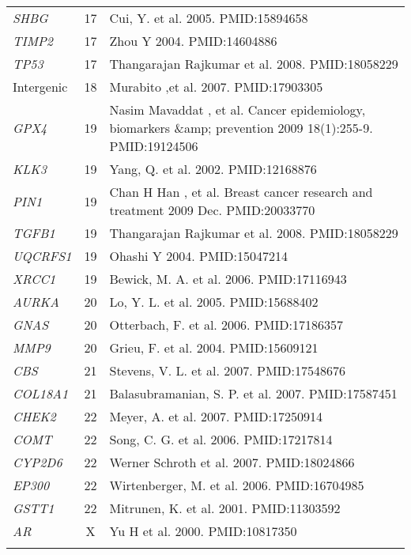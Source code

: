 \documentclass[10pt]{article}
\begin{document}
\begin{landscape}
\begin{center}
\begin{longtable}[H]{lcl}
\textit{SHBG} & 17 & Cui, Y.  et al. 2005. PMID:15894658\\[2pt]
\textit{TIMP2} & 17 & Zhou Y 2004. PMID:14604886\\[2pt]
\textit{TP53} & 17 & Thangarajan Rajkumar  et al.  2008. PMID:18058229\\[2pt]
Intergenic & 18 & Murabito ,et al. 2007. PMID:17903305\\[2pt]
\textit{GPX4} & 19 & Nasim Mavaddat  , et al.  Cancer epidemiology, biomarkers \&amp; prevention
  2009 18(1):255-9. PMID:19124506\\[2pt]
\textit{KLK3} & 19 & Yang, Q.  et al. 2002. PMID:12168876\\[2pt]
\textit{PIN1} & 19 & Chan H Han  , et al.  Breast cancer research and treatment  2009 Dec.
PMID:20033770\\[2pt]
\textit{TGFB1} & 19 & Thangarajan Rajkumar  et al.  2008. PMID:18058229\\[2pt]
\textit{UQCRFS1} & 19 & Ohashi Y 2004. PMID:15047214\\[2pt]
\textit{XRCC1} & 19 & Bewick, M. A.  et al. 2006. PMID:17116943\\[2pt]
\textit{AURKA} & 20 & Lo, Y. L.  et al. 2005. PMID:15688402\\[2pt]
\textit{GNAS} & 20 & Otterbach, F.  et al. 2006. PMID:17186357\\[2pt]
\textit{MMP9} & 20 & Grieu, F.  et al. 2004. PMID:15609121\\[2pt]
\textit{CBS} & 21 & Stevens, V. L.  et al. 2007. PMID:17548676\\[2pt]
\textit{COL18A1} & 21 & Balasubramanian, S. P.  et al. 2007. PMID:17587451\\[2pt]
\textit{CHEK2} & 22 & Meyer, A.  et al. 2007. PMID:17250914\\[2pt]
\textit{COMT} & 22 & Song, C. G.  et al. 2006. PMID:17217814\\[2pt]
\textit{CYP2D6} & 22 & Werner Schroth  et al.  2007. PMID:18024866\\[2pt]
\textit{EP300} & 22 & Wirtenberger, M.  et al. 2006. PMID:16704985\\[2pt]
\textit{GSTT1} & 22 & Mitrunen, K.  et al. 2001. PMID:11303592\\[2pt]
\textit{AR} & X & Yu H et al. 2000. PMID:10817350\\[1.5pt]\hline\hline

\label{genes:  cancer} 
\end{longtable}
\end{center}
\end{landscape}
\end{document}
